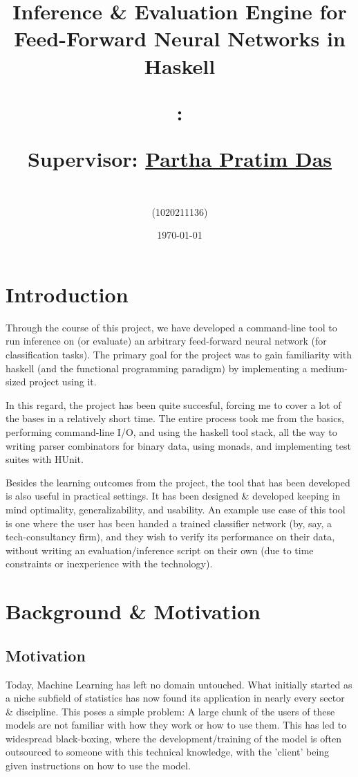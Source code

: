 \documentclass[12pt, titlepage]{article}
\title{Inference \& Evaluation Engine for Feed-Forward Neural Networks in Haskell\vspace*{2mm}

{\large \code: \name}

{\large Supervisor: \href{https://www.ashoka.edu.in/profile/partha-pratim-das/}{Partha Pratim Das}}}
\author{\textbf{\me}\\(1020211136)}
\date{\today}
\begin{document}
\maketitle

\tableofcontents
\newpage

\section{Introduction}
Through the course of this project, we have developed a command-line tool to run inference on (or evaluate) an arbitrary feed-forward neural network (for classification tasks). The primary goal for the project was to gain familiarity with haskell (and the functional programming paradigm) by implementing a medium-sized project using it.\bigskip

In this regard, the project has been quite succesful, forcing me to cover a lot of the bases in a relatively short time. The entire process took me from the basics, performing command-line I/O, and using the haskell tool stack, all the way to writing parser combinators for binary data, using monads, and implementing test suites with HUnit.\bigskip

Besides the learning outcomes from the project, the tool that has been developed is also useful in practical settings. It has been designed \& developed keeping in mind optimality, generalizability, and usability. An example use case of this tool is one where the user has been handed a trained classifier network (by, say, a tech-consultancy firm), and they wish to verify its performance on their data, without writing an evaluation/inference script on their own (due to time constraints or inexperience with the technology).

\section{Background \& Motivation}
\subsection{Motivation}
Today, Machine Learning has left no domain untouched. What initially started as a niche subfield of statistics has now found its application in nearly every sector \& discipline. This poses a simple problem: A large chunk of the users of these models are not familiar with how they work or how to use them. This has led to widespread black-boxing, where the development/training of the model is often outsourced to someone with this technical knowledge, with the 'client' being given instructions on how to use the model.\bigskip
\end{document}
